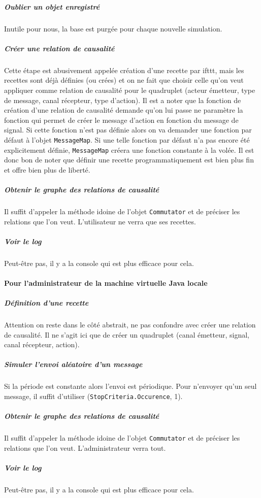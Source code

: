 \documentclass[11pt]{article}
\begin{document}
\subparagraph{Oublier un objet enregistré} Inutile pour nous, la base est purgée pour chaque nouvelle simulation.

\subparagraph{Créer une relation de causalité} Cette étape est abusivement appelée création d'une recette par ifttt, mais les recettes sont déjà définies (ou crées) et on ne fait que choisir celle qu'on veut appliquer comme relation de causalité pour le quadruplet (acteur émetteur, type de message, canal récepteur, type d'action). Il est a noter que la fonction de création d'une relation de causalité demande qu'on lui passe ne paramètre la fonction qui permet de créer le message d'action en fonction du message de signal. Si cette fonction n'est pas définie alors on va demander une fonction par défaut à l'objet \texttt{MessageMap}. Si une telle fonction par défaut n'a pas encore été explicitement définie, \texttt{MessageMap} créera une fonction constante à la volée. Il est donc bon de noter que définir une recette programmatiquement est bien plus fin et offre bien plus de liberté.

\subparagraph{Obtenir le graphe des relations de causalité} Il suffit d'appeler la méthode idoine de l'objet \texttt{Commutator} et de préciser les relations que l'on veut. L'utilisateur ne verra que ses recettes.

\subparagraph{Voir le log} Peut-être pas, il y a la console qui est plus efficace pour cela.

\paragraph{Pour l'administrateur de la machine virtuelle Java locale}

\subparagraph{Définition d'une recette} Attention on reste dans le côté abstrait, ne pas confondre avec créer une relation de causalité. Il ne s'agit ici que de créer un quadruplet (canal émetteur, signal, canal récepteur, action).

\subparagraph{Simuler l'envoi aléatoire d'un message} Si la période est constante alors l'envoi est périodique. Pour n'envoyer qu'un seul message, il suffit d'utiliser (\texttt{StopCriteria.Occurence}, 1).

\subparagraph{Obtenir le graphe des relations de causalité} Il suffit d'appeler la méthode idoine de l'objet \texttt{Commutator} et de préciser les relations que l'on veut. L'administrateur verra tout.

\subparagraph{Voir le log} Peut-être pas, il y a la console qui est plus efficace pour cela.
\end{document}

